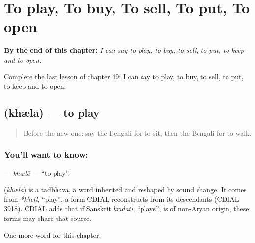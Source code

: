 
\chapter{To play, To buy, To sell, To put, To open}
\label{ch:bn-to-play-to-buy-to-sell-to-put-to-open}

\begin{chapteropening}
\textbf{By the end of this chapter:} \emph{I can say to play, to buy, to sell, to put, to keep and to open.}

Complete the last lesson of chapter 49: I can say to play, to buy, to sell, to put, to keep and to open.
\end{chapteropening}

\section[\texorpdfstring{\bn{খেলা} (khælā)}{খেলা (khælā)}]{ (khælā) — to play}

\label{lesson:BN-C49-khla}



\begin{quote}
Before the new one: say the Bengali for to sit, then the Bengali for to walk.
\end{quote}

\subsection*{You'll want to know: }
\textbf{} — \emph{khælā} — \textquotedblleft{}to play\textquotedblright{}.

\begin{cousinweb}
\textbf{} (\emph{khælā}) is a tadbhava, a word inherited and reshaped by sound change. It comes from \emph{*khell}, \textquotedblleft{}play\textquotedblright{}, a form CDIAL reconstructs from its descendants (CDIAL 3918). CDIAL adds that if Sanskrit \emph{krīḍati}, \textquotedblleft{}plays\textquotedblright{}, is of non-Aryan origin, these forms may share that source.
\end{cousinweb}

\begin{grammarlens}[title={What you've built}]
One more word for this chapter.
\end{grammarlens}


